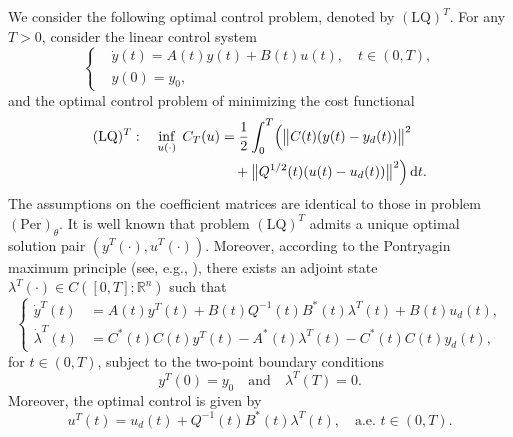 \documentclass{IEEEtran}
\begin{document}
	We consider the following optimal control problem, denoted by $(\text{LQ})^T$. For any $T>0$, consider the linear control system
	\begin{equation*}
		\left\{
		\begin{aligned}
			&\dot{y}(t)=A(t)y(t)+B(t)u(t),\quad t\in (0,T),\\
			&y(0)=y_0,
		\end{aligned}
		\right.
	\end{equation*}
	and the optimal control problem of minimizing the cost functional
	\begin{equation*}
		\begin{aligned}[b]
			(\text{LQ})^T:\quad
			\inf_{u(\cdot)}\; C_T(u) &= \frac{1}{2}\int_0^T \Bigl( \bigl\|C(t)(y(t)-y_d(t))\bigr\|^2 \\
			&\quad + \bigl\|Q^{1/2}(t)(u(t)-u_d(t))\bigr\|^2 \Bigr)\,\mathrm{d}t.
		\end{aligned}
	\end{equation*}
	The assumptions on the coefficient matrices are identical to those in problem $(\text{Per})_\theta$. It is well known that problem $(\text{LQ})^T$ admits a unique optimal solution pair $(y^T(\cdot),u^T(\cdot))$. Moreover, according to the Pontryagin maximum principle (see, e.g., \cite{L}), there exists an adjoint state $\lambda^T(\cdot) \in C([0,T];\mathbb R^n)$ such that
	\begin{equation}\label{eq:LQT_system}
		\left\{
		\begin{aligned}
			\dot{y}^T(t) &= A(t)y^T(t) + B(t)Q^{-1}(t)B^*(t)\lambda^T(t) + B(t)u_d(t), \\[1mm]
			\dot{\lambda}^T(t) &= C^*(t)C(t)y^T(t) - A^*(t)\lambda^T(t) - C^*(t)C(t)y_d(t),
		\end{aligned}
		\right.
	\end{equation}
	for $t\in (0,T)$, subject to the two-point boundary conditions
	\begin{equation}
		y^T(0)=y_0 \quad \text{and} \quad \lambda^T(T)=0.
	\end{equation}
	Moreover, the optimal control is given by 
	\begin{equation}
		u^T(t)=u_d(t)+Q^{-1}(t)B^*(t)\lambda^T(t),\quad \text{a.e. } t\in(0,T).
	\end{equation}
	
\end{document}
